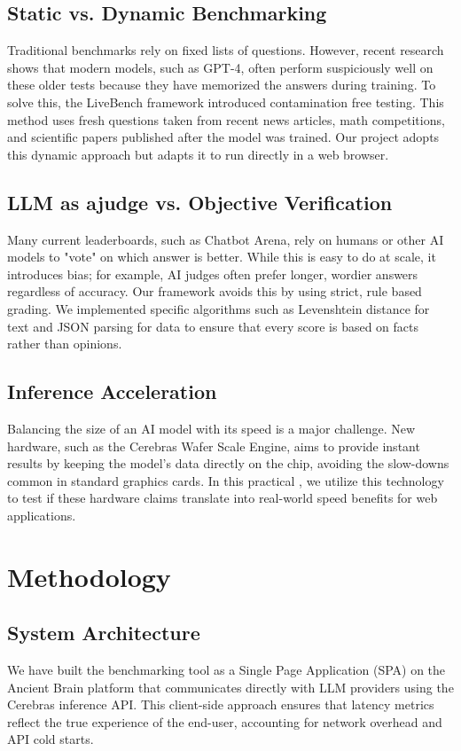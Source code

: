\documentclass[10pt, twocolumn, a4paper]{article}
\begin{document}
\subsection{Static vs. Dynamic Benchmarking}

Traditional benchmarks rely on fixed lists of questions. However, recent research shows that modern models, such as GPT-4, often perform suspiciously well on these older tests because they have memorized the answers during training. To solve this, the LiveBench framework \cite{white2025livebench}  introduced contamination free testing. This method uses fresh questions taken from recent news articles, math competitions, and scientific papers published after the model was trained. Our project adopts this dynamic approach but adapts it to run directly in a web browser.
\subsection{LLM as ajudge vs. Objective Verification}
Many current leaderboards, such as Chatbot Arena, rely on humans or other AI models to "vote" on which answer is better. While this is easy to do at scale, it introduces bias; for example, AI judges often prefer longer, wordier answers regardless of accuracy. Our framework avoids this by using strict, rule based grading. We implemented specific algorithms such as Levenshtein distance for text and JSON parsing for data to ensure that every score is based on facts rather than opinions.

\subsection{Inference Acceleration}
Balancing the size of an AI model with its speed is a major challenge. New hardware, such as the Cerebras Wafer Scale Engine, aims to provide instant results by keeping the model's data directly on the chip, avoiding the slow-downs common in standard graphics cards. In this practical , we utilize this technology to test if these hardware claims translate into real-world speed benefits for web applications.

\section{Methodology}

\subsection{System Architecture}
We have built the benchmarking tool as a Single Page Application (SPA) on the Ancient Brain platform that communicates directly with LLM providers using the Cerebras inference API. This client-side approach ensures that latency metrics reflect the true experience of the end-user, accounting for network overhead and API cold starts.
\end{document}
